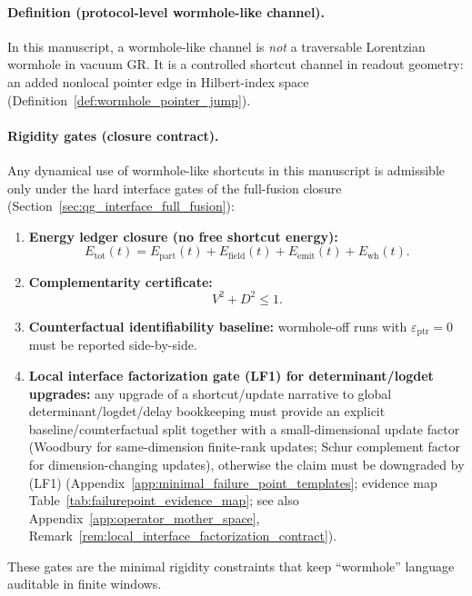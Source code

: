 \paragraph{Definition (protocol-level wormhole-like channel).}
\InterfaceTag In this manuscript, a wormhole-like channel is \emph{not} a traversable Lorentzian wormhole in vacuum GR.
It is a controlled shortcut channel in readout geometry: an added nonlocal pointer edge in Hilbert-index space
(Definition~\ref{def:wormhole_pointer_jump}).

\paragraph{Rigidity gates (closure contract).}
\InterfaceTag Any dynamical use of wormhole-like shortcuts in this manuscript is admissible only under the hard interface gates of the full-fusion closure
(Section~\ref{sec:qg_interface_full_fusion}):
\begin{enumerate}
\item \textbf{Energy ledger closure (no free shortcut energy):}
\[
E_{\mathrm{tot}}(t)=E_{\mathrm{part}}(t)+E_{\mathrm{field}}(t)+E_{\mathrm{emit}}(t)+E_{\mathrm{wh}}(t).
\]
\item \textbf{Complementarity certificate:}
\[
V^2+D^2\le 1.
\]
\item \textbf{Counterfactual identifiability baseline:} wormhole-off runs with $\varepsilon_{\mathrm{ptr}}=0$ must be reported side-by-side.
\item \textbf{Local interface factorization gate (LF1) for determinant/logdet upgrades:}
any upgrade of a shortcut/update narrative to global determinant/logdet/delay bookkeeping must provide an explicit baseline/counterfactual split together with a small-dimensional update factor
(Woodbury for same-dimension finite-rank updates; Schur complement factor for dimension-changing updates), otherwise the claim must be downgraded by (LF1)
(Appendix~\ref{app:minimal_failure_point_templates}; evidence map Table~\ref{tab:failurepoint_evidence_map}; see also Appendix~\ref{app:operator_mother_space}, Remark~\ref{rem:local_interface_factorization_contract}).
\end{enumerate}
These gates are the minimal rigidity constraints that keep ``wormhole'' language auditable in finite windows.

